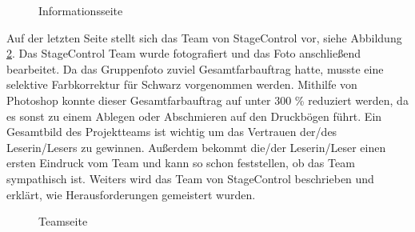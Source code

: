 \begin{figure}[H]
	\centering
	\caption[Informationsseite]{Informationsseite}
	\label{fig:Informationsseite}
\end{figure} 
\newpage
Auf der letzten Seite stellt sich das Team von StageControl vor, siehe Abbildung \ref{fig:Teamseite}. Das StageControl Team wurde fotografiert und das Foto anschließend bearbeitet. Da das Gruppenfoto zuviel Gesamtfarbauftrag hatte, musste eine selektive Farbkorrektur für Schwarz vorgenommen werden. Mithilfe von Photoshop konnte dieser Gesamtfarbauftrag auf unter 300 \% reduziert werden, da es sonst zu einem Ablegen oder Abschmieren auf den Druckbögen führt. Ein Gesamtbild des Projektteams ist wichtig um das Vertrauen der/des Leserin/Lesers zu gewinnen. Außerdem bekommt die/der Leserin/Leser einen ersten Eindruck vom Team und kann so schon feststellen, ob das Team sympathisch ist. Weiters wird das Team von StageControl beschrieben und erklärt, wie Herausforderungen gemeistert wurden.

\begin{figure}[H]
	\centering
	\caption[Teamseite]{Teamseite}
	\label{fig:Teamseite}
\end{figure} 

